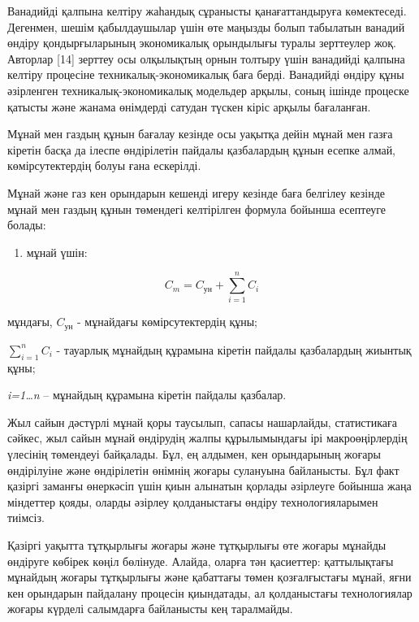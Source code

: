\begin{multicols}{2}
Ванадийді қалпына келтіру жаһандық сұранысты қанағаттандыруға
көмектеседі. Дегенмен, шешім қабылдаушылар үшін өте маңызды болып
табылатын ванадий өндіру қондырғыларының экономикалық орындылығы туралы
зерттеулер жоқ. Авторлар {[}14{]} зерттеу осы олқылықтың орнын толтыру
үшін ванадийді қалпына келтіру процесіне техникалық-экономикалық баға
берді. Ванадийді өндіру құны әзірленген техникалық-экономикалық
модельдер арқылы, соның ішінде процеске қатысты және жанама өнімдерді
сатудан түскен кіріс арқылы бағаланған.

Мұнай мен газдың құнын бағалау кезінде осы уақытқа дейін мұнай мен газға
кіретін басқа да ілеспе өндірілетін пайдалы қазбалардың құнын есепке
алмай, көмірсутектердің болуы ғана ескерілді.

Мұнай және газ кен орындарын кешенді игеру кезінде баға белгілеу кезінде
мұнай мен газдың құнын төмендегі келтірілген формула бойынша есептеуге
болады:

\begin{enumerate}
\def\labelenumi{\arabic{enumi})}
\item
  мұнай үшін:
\end{enumerate}

\begin{equation}
  C_m = C_{\text{ун}} + \sum_{i=1}^{n} C_i
  \end{equation}

мұндағы, $C_{\text{ун}}$ - мұнайдағы көмірсутектердің құны;

$\sum_{i=1}^{n} C_i$ - тауарлық мұнайдың құрамына кіретін пайдалы
қазбалардың жиынтық құны;

\emph{i=1\ldots n} -- мұнайдың құрамына кіретін пайдалы қазбалар.

Жыл сайын дәстүрлі мұнай қоры таусылып, сапасы нашарлайды, статистикаға
сәйкес, жыл сайын мұнай өндірудің жалпы құрылымындағы ірі
макроөңірлердің үлесінің төмендеуі байқалады. Бұл, ең алдымен, кен
орындарының жоғары өндірілуіне және өндірілетін өнімнің жоғары сулануына
байланысты. Бұл факт қазіргі заманғы өнеркәсіп үшін қиын алынатын
қорлады әзірлеуге бойынша жаңа міндеттер қояды, оларды әзірлеу
қолданыстағы өндіру технологияларымен тиімсіз.

Қазіргі уақытта тұтқырлығы жоғары және тұтқырлығы өте жоғары мұнайды
өндіруге көбірек көңіл бөлінуде. Алайда, оларға тән қасиеттер:
қаттылықтағы мұнайдың жоғары тұтқырлығы және қабаттағы төмен
қозғалғыстағы мұнай, яғни кен орындарын пайдалану процесін қиындатады,
ал қолданыстағы технологиялар жоғары күрделі салымдарға байланысты кең
таралмайды.


\end{multicols}
